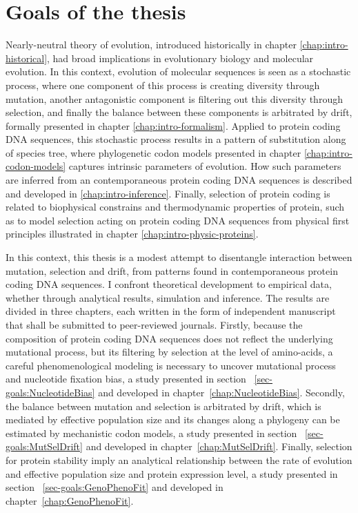 \chapter{Goals of the thesis}
{\hypersetup{linkcolor=GREYDARK}\minitoc}
\label{chap:goals}

Nearly-neutral theory of evolution, introduced historically in chapter \ref{chap:intro-historical}, had broad implications in evolutionary biology and molecular evolution.
In this context, evolution of molecular sequences is seen as a stochastic process, where one component of this process is creating diversity through mutation, another antagonistic component is filtering out this diversity through selection, and finally the balance between these components is arbitrated by drift, formally presented in chapter \ref{chap:intro-formalism}.
Applied to protein coding DNA sequences, this stochastic process results in a pattern of substitution along of species tree, where phylogenetic codon models presented in chapter \ref{chap:intro-codon-models} captures intrinsic parameters of evolution.
How such parameters are inferred from an contemporaneous protein coding DNA sequences is described and developed in \ref{chap:intro-inference}.
Finally, selection of protein coding is related to biophysical constrains and thermodynamic properties of protein, such as to model selection acting on protein coding DNA sequences from physical first principles illustrated in chapter \ref{chap:intro-physic-proteins}.

In this context, this thesis is a modest attempt to disentangle interaction between mutation, selection and drift, from patterns found in contemporaneous protein coding DNA sequences.
I confront theoretical development to empirical data, whether through analytical results, simulation and inference.
The results are divided in three chapters, each written in the form of independent manuscript that shall be submitted to peer-reviewed journals.
Firstly, because the composition of protein coding DNA sequences does not reflect the underlying mutational process, but its filtering by selection at the level of amino-acids, a careful phenomenological modeling is necessary to uncover mutational process and nucleotide fixation bias, a study presented in section ~\ref{sec-goals:NucleotideBias} and developed in chapter~\ref{chap:NucleotideBias}.
Secondly, the balance between mutation and selection is arbitrated by drift, which is mediated by effective population size and its changes along a phylogeny can be estimated by mechanistic codon models, a study presented in section ~\ref{sec-goals:MutSelDrift} and developed in chapter~\ref{chap:MutSelDrift}.
Finally, selection for protein stability imply an analytical relationship between the rate of evolution and effective population size and protein expression level, a study presented in section ~\ref{sec-goals:GenoPhenoFit} and developed in chapter~\ref{chap:GenoPhenoFit}.

